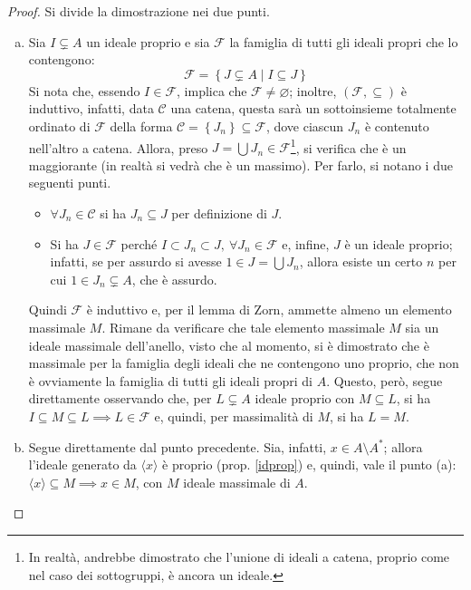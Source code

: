 \documentclass[11pt]{article}
\theoremstyle{style}
\numberwithin{equation}{subsection}
\begin{document}
	\begin{proof}
		Si divide la dimostrazione nei due punti.
		\begin{enumerate}[(a).]
			\item Sia $I \subsetneq A$ un ideale proprio e sia $\mathcal{F} $ la famiglia di tutti gli ideali propri che lo contengono:
				\[
				\mathcal{F} =\left\{ J\subsetneq A  \mid I \subseteq J \right\} 
				\] 
				Si nota che, essendo $I \in \mathcal{F} $, implica che $\mathcal{F } \neq \varnothing$; inoltre, $(\mathcal{F} ,\subseteq )$ \`e induttivo, infatti, data $\mathcal{C} $ una catena, questa sar\`a un sottoinsieme totalmente ordinato di $\mathcal{F} $ della forma $\mathcal{C} =\left\{ J_n \right\} \subseteq \mathcal{F} $, dove ciascun $J_n$ \`e contenuto nell'altro a catena.
				Allora, preso $J = \bigcup J_n \in \mathcal{F} $\footnote{In realt\`a, andrebbe dimostrato che l'unione di ideali a catena, proprio come nel caso dei sottogruppi, \`e ancora un ideale.}, si verifica che \`e un maggiorante (in realt\`a si vedr\`a che \`e un massimo).
				Per farlo, si notano i due seguenti punti.
				\begin{itemize}
					\item $\forall J_n \in \mathcal{C} $ si ha $ J_n\subseteq J$ per definizione di $J$.
					\item Si ha $J \in \mathcal{F} $ perch\'e $I \subset J_n \subset J, \ \forall J_n \in \mathcal{F} $ e, infine, $J$ \`e un ideale proprio; infatti, se per assurdo si avesse $1 \in  J = \bigcup J_n$, allora esiste un certo $n$ per cui $1 \in J_n \subsetneq A$, che \`e assurdo.
				\end{itemize}
				Quindi $\mathcal{F} $ \`e induttivo e, per il lemma di Zorn, ammette almeno un elemento massimale $M$.
Rimane da verificare che tale elemento massimale $M$ sia un ideale massimale dell'anello, visto che al momento, si \`e dimostrato che \`e massimale per la famiglia degli ideali che ne contengono uno proprio, che non \`e ovviamente la famiglia di tutti gli ideali propri di $A$.
Questo, per\`o, segue direttamente osservando che, per $L \subsetneq A$ ideale proprio con $M \subseteq L$, si ha $I \subseteq M \subseteq L \implies L \in \mathcal{F} $ e, quindi, per massimalit\`a di $M$, si ha $L = M$.
\item Segue direttamente dal punto precedente.
	Sia, infatti, $x \in A \setminus A^*$; allora l'ideale generato da $\langle x \rangle$ \`e proprio (prop. \ref{idprop}) e, quindi, vale il punto (a): $\langle x \rangle\subseteq M \implies x \in M$, con $M$ ideale massimale di $A$.
		\end{enumerate}
	\end{proof}
\end{document}
